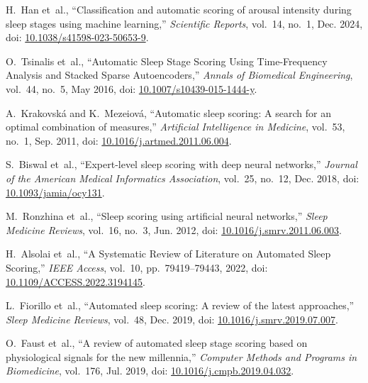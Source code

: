\begin{thebibliography}{99}
	
	H.~Han et~al., ``Classification and automatic scoring of arousal intensity during sleep stages using machine learning,'' \emph{Scientific Reports}, vol.~14, no.~1, Dec. 2024, doi: \href{https://doi.org/10.1038/s41598-023-50653-9}{10.1038/s41598-023-50653-9}.
	
	O.~Tsinalis et~al., ``Automatic Sleep Stage Scoring Using Time-Frequency Analysis and Stacked Sparse Autoencoders,'' \emph{Annals of Biomedical Engineering}, vol.~44, no.~5, May 2016, doi: \href{https://doi.org/10.1007/s10439-015-1444-y}{10.1007/s10439-015-1444-y}.
	
	A.~Krakovská and K.~Mezeiová, ``Automatic sleep scoring: A search for an optimal combination of measures,'' \emph{Artificial Intelligence in Medicine}, vol.~53, no.~1, Sep. 2011, doi: \href{https://doi.org/10.1016/j.artmed.2011.06.004}{10.1016/j.artmed.2011.06.004}.
	
	S.~Biswal et~al., ``Expert-level sleep scoring with deep neural networks,'' \emph{Journal of the American Medical Informatics Association}, vol.~25, no.~12, Dec. 2018, doi: \href{https://doi.org/10.1093/jamia/ocy131}{10.1093/jamia/ocy131}.
	
	M.~Ronzhina et~al., ``Sleep scoring using artificial neural networks,'' \emph{Sleep Medicine Reviews}, vol.~16, no.~3, Jun. 2012, doi: \href{https://doi.org/10.1016/j.smrv.2011.06.003}{10.1016/j.smrv.2011.06.003}.
	
	H.~Alsolai et~al., ``A Systematic Review of Literature on Automated Sleep Scoring,'' \emph{IEEE Access}, vol.~10, pp.~79419--79443, 2022, doi: \href{https://doi.org/10.1109/ACCESS.2022.3194145}{10.1109/ACCESS.2022.3194145}.
	
	L.~Fiorillo et~al., ``Automated sleep scoring: A review of the latest approaches,'' \emph{Sleep Medicine Reviews}, vol.~48, Dec. 2019, doi: \href{https://doi.org/10.1016/j.smrv.2019.07.007}{10.1016/j.smrv.2019.07.007}.
	
	O.~Faust et~al., ``A review of automated sleep stage scoring based on physiological signals for the new millennia,'' \emph{Computer Methods and Programs in Biomedicine}, vol.~176, Jul. 2019, doi: \href{https://doi.org/10.1016/j.cmpb.2019.04.032}{10.1016/j.cmpb.2019.04.032}.
	

\end{thebibliography}
